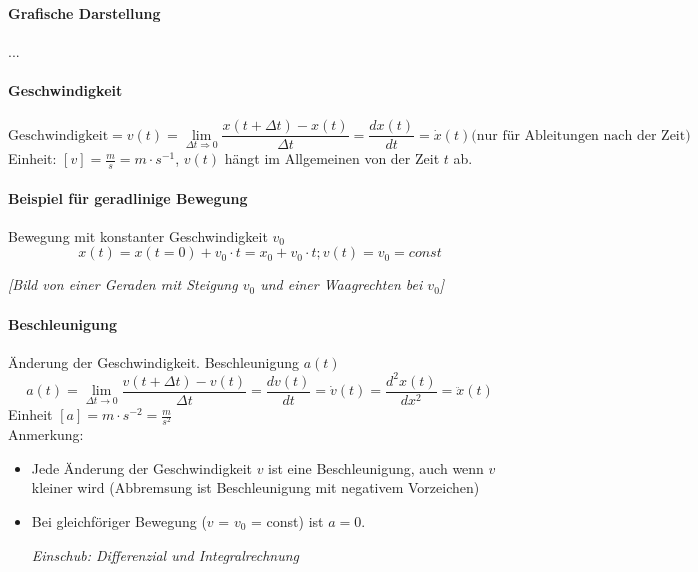 \documentclass[a4paper,10pt, fleqn]{article}
\begin{document}
\paragraph{Grafische Darstellung}
...

\paragraph{Geschwindigkeit}

\[
  \text{Geschwindigkeit} = v(t) = \lim_{\Delta t \Rightarrow 0} \frac{x(t + \Delta t) - x(t)}{\Delta t}
  = \frac{dx(t)}{dt} = \dot{x}(t) \text{(nur für Ableitungen nach der Zeit)}
\]
Einheit: $[v] = \frac{m}{s} = m\cdot s^{-1}$, $v(t)$ hängt im Allgemeinen von der Zeit $t$ ab.

\paragraph{Beispiel für geradlinige Bewegung}

Bewegung mit konstanter Geschwindigkeit $v_{0}$
$$x(t) = x(t = 0) + v_{0} \cdot t = x_{0} + v_{0} \cdot t; v(t) = v_{0} = const$$

\textit{[Bild von einer Geraden mit Steigung $v_{0}$ und einer Waagrechten bei $v_{0}$]}

\paragraph{Beschleunigung}

Änderung der Geschwindigkeit. Beschleunigung $a(t)$
$$a(t) = \lim_{\Delta t \rightarrow 0}\frac{v(t + \Delta t) - v(t)}{\Delta t} = \frac{dv(t)}{dt} = \dot{v}(t) = \frac{d^{2}x(t)}{dx^{2}} = \ddot{x}(t)$$
Einheit $[a] = m\cdot s^{-2} = \frac{m}{s^{2}}$ \\
Anmerkung:
\begin{itemize}
\item Jede Änderung der Geschwindigkeit $v$ ist eine Beschleunigung,
  auch wenn $v$ kleiner wird (Abbremsung ist Beschleunigung mit
  negativem Vorzeichen)
\item Bei gleichföriger Bewegung ($v$ = $v_{0}$ = const) ist $a = 0$.

\textit{Einschub: Differenzial und Integralrechnung}
\end{itemize}
\end{document}
